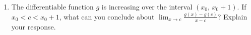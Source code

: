 \documentclass[12pt]{report}
\begin{document}
\begin{enumerate}
\item The differentiable function $g$ is increasing over the interval $(x_0, \, x_0+1)$. If $x_0 < c < x_0+1$, what can you conclude about $\lim_{x \to c}\frac{g(x)-g(c)}{x-c}$? Explain your response. 

\end{enumerate}
\end{document}
